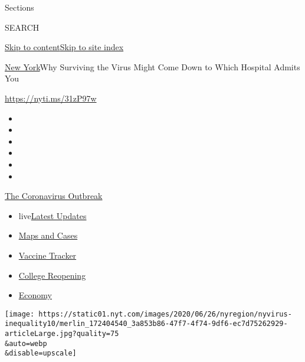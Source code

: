 Sections

SEARCH

\protect\hyperlink{site-content}{Skip to
content}\protect\hyperlink{site-index}{Skip to site index}

\href{/section/nyregion}{New York}\textbar{}Why Surviving the Virus
Might Come Down to Which Hospital Admits You

\url{https://nyti.ms/31zP97w}

\begin{itemize}
\item
\item
\item
\item
\item
\item
\end{itemize}

\href{https://www.nytimes.com/news-event/coronavirus?action=click\&pgtype=Article\&state=default\&region=TOP_BANNER\&context=storylines_menu}{The
Coronavirus Outbreak}

\begin{itemize}
\tightlist
\item
  live\href{https://www.nytimes.com/2020/08/04/world/coronavirus-cases.html?action=click\&pgtype=Article\&state=default\&region=TOP_BANNER\&context=storylines_menu}{Latest
  Updates}
\item
  \href{https://www.nytimes.com/interactive/2020/us/coronavirus-us-cases.html?action=click\&pgtype=Article\&state=default\&region=TOP_BANNER\&context=storylines_menu}{Maps
  and Cases}
\item
  \href{https://www.nytimes.com/interactive/2020/science/coronavirus-vaccine-tracker.html?action=click\&pgtype=Article\&state=default\&region=TOP_BANNER\&context=storylines_menu}{Vaccine
  Tracker}
\item
  \href{https://www.nytimes.com/2020/08/02/us/covid-college-reopening.html?action=click\&pgtype=Article\&state=default\&region=TOP_BANNER\&context=storylines_menu}{College
  Reopening}
\item
  \href{https://www.nytimes.com/live/2020/08/04/business/stock-market-today-coronavirus?action=click\&pgtype=Article\&state=default\&region=TOP_BANNER\&context=storylines_menu}{Economy}
\end{itemize}

\texttt{[image: https://static01.nyt.com/images/2020/06/26/nyregion/nyvirus-inequality10/merlin\_172404540\_3a853b86-47f7-4f74-9df6-ec7d75262929-articleLarge.jpg?quality=75\\\&auto=webp\\\&disable=upscale]}

